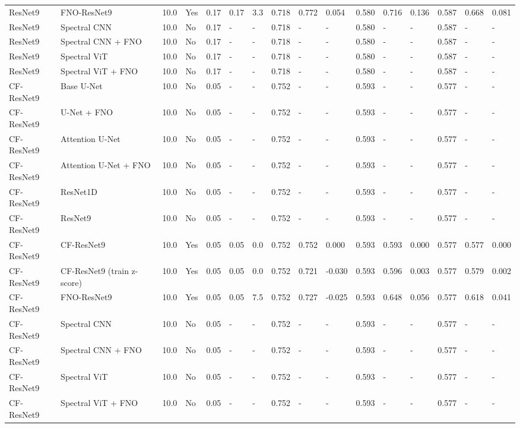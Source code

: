 \begin{longtable}{llllllllllllllll}
ResNet9 & FNO-ResNet9 & 10.0 & Yes & 0.17 & 0.17 & 3.3 & 0.718 & 0.772 & 0.054 & 0.580 & 0.716 & 0.136 & 0.587 & 0.668 & 0.081 \\
ResNet9 & Spectral CNN & 10.0 & No & 0.17 & - & - & 0.718 & - & - & 0.580 & - & - & 0.587 & - & - \\
ResNet9 & Spectral CNN + FNO & 10.0 & No & 0.17 & - & - & 0.718 & - & - & 0.580 & - & - & 0.587 & - & - \\
ResNet9 & Spectral ViT & 10.0 & No & 0.17 & - & - & 0.718 & - & - & 0.580 & - & - & 0.587 & - & - \\
ResNet9 & Spectral ViT + FNO & 10.0 & No & 0.17 & - & - & 0.718 & - & - & 0.580 & - & - & 0.587 & - & - \\
CF-ResNet9 & Base U-Net & 10.0 & No & 0.05 & - & - & 0.752 & - & - & 0.593 & - & - & 0.577 & - & - \\
CF-ResNet9 & U-Net + FNO & 10.0 & No & 0.05 & - & - & 0.752 & - & - & 0.593 & - & - & 0.577 & - & - \\
CF-ResNet9 & Attention U-Net & 10.0 & No & 0.05 & - & - & 0.752 & - & - & 0.593 & - & - & 0.577 & - & - \\
CF-ResNet9 & Attention U-Net + FNO & 10.0 & No & 0.05 & - & - & 0.752 & - & - & 0.593 & - & - & 0.577 & - & - \\
CF-ResNet9 & ResNet1D & 10.0 & No & 0.05 & - & - & 0.752 & - & - & 0.593 & - & - & 0.577 & - & - \\
CF-ResNet9 & ResNet9 & 10.0 & No & 0.05 & - & - & 0.752 & - & - & 0.593 & - & - & 0.577 & - & - \\
CF-ResNet9 & CF-ResNet9 & 10.0 & Yes & 0.05 & 0.05 & 0.0 & 0.752 & 0.752 & 0.000 & 0.593 & 0.593 & 0.000 & 0.577 & 0.577 & 0.000 \\
CF-ResNet9 & CF-ResNet9 (train z-score) & 10.0 & Yes & 0.05 & 0.05 & 0.0 & 0.752 & 0.721 & -0.030 & 0.593 & 0.596 & 0.003 & 0.577 & 0.579 & 0.002 \\
CF-ResNet9 & FNO-ResNet9 & 10.0 & Yes & 0.05 & 0.05 & 7.5 & 0.752 & 0.727 & -0.025 & 0.593 & 0.648 & 0.056 & 0.577 & 0.618 & 0.041 \\
CF-ResNet9 & Spectral CNN & 10.0 & No & 0.05 & - & - & 0.752 & - & - & 0.593 & - & - & 0.577 & - & - \\
CF-ResNet9 & Spectral CNN + FNO & 10.0 & No & 0.05 & - & - & 0.752 & - & - & 0.593 & - & - & 0.577 & - & - \\
CF-ResNet9 & Spectral ViT & 10.0 & No & 0.05 & - & - & 0.752 & - & - & 0.593 & - & - & 0.577 & - & - \\
CF-ResNet9 & Spectral ViT + FNO & 10.0 & No & 0.05 & - & - & 0.752 & - & - & 0.593 & - & - & 0.577 & - & - \\

\end{longtable}
